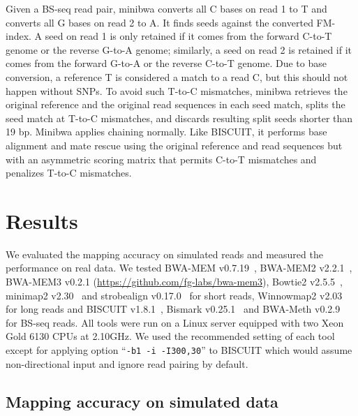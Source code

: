 \documentclass[webpdf,contemporary,large,namedate]{oup-authoring-template}%
\begin{document}
Given a BS-seq read pair, minibwa converts all C bases on read 1 to T
and converts all G bases on read 2 to A.
It finds seeds against the converted FM-index.
A seed on read 1 is only retained if it comes from the forward C-to-T genome or the reverse G-to-A genome;
similarly, a seed on read 2 is retained if it comes from the forward G-to-A or the reverse C-to-T genome.
Due to base conversion, a reference T is considered a match to a read C, but this should not happen without SNPs.
To avoid such T-to-C mismatches, minibwa retrieves the original reference and the original read sequences in each seed match,
splits the seed match at T-to-C mismatches, and discards resulting split seeds shorter than 19 bp.
Minibwa applies chaining normally.
Like BISCUIT, it performs base alignment and mate rescue using the original reference and read sequences but with
an asymmetric scoring matrix that permits C-to-T mismatches and penalizes T-to-C mismatches.

\section{Results}

We evaluated the mapping accuracy on simulated reads and
measured the performance on real data.
We tested BWA-MEM v0.7.19~\citep{Li:2013aa}, BWA-MEM2 v2.2.1~\citep{DBLP:conf/ipps/VasimuddinMLA19},
BWA-MEM3 v0.2.1 (\url{https://github.com/fg-labs/bwa-mem3}),
Bowtie2 v2.5.5~\citep{Langmead:2012fk}, minimap2 v2.30~\citep{Li:2018ab} and strobealign v0.17.0~\citep{Sahlin:2022aa} for short reads,
Winnowmap2 v2.03~\citep{Jain:2020aa,Jain:2022ua} for long reads
and BISCUIT v1.8.1~\citep{Zhou:2024ac}, Bismark v0.25.1~\citep{Krueger:2011aa}
and BWA-Meth v0.2.9~\citep{Pedersen:2014aa} for BS-seq reads.
All tools were run on a Linux server equipped with two Xeon Gold 6130 CPUs at 2.10GHz.
We used the recommended setting of each tool except for applying option ``{\tt -b1 -i -I300,30}'' to BISCUIT
which would assume non-directional input and ignore read pairing by default.

\subsection{Mapping accuracy on simulated data}\label{sec:eval-sim}
\end{document}
